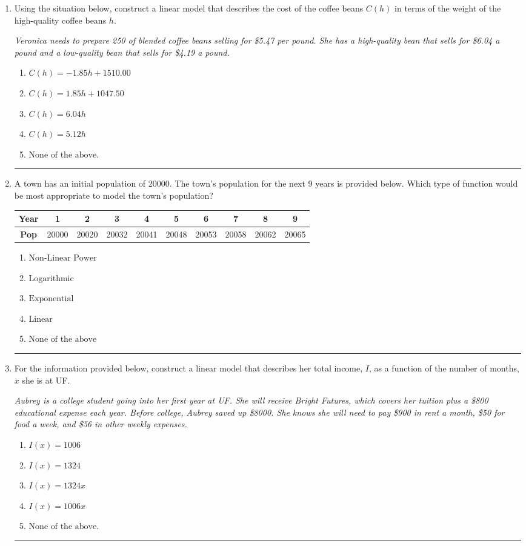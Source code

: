 \documentclass[14pt]{extbook}
\newcommand{\litem}[1]{\item#1\hspace*{-1cm}\rule{\textwidth}{0.4pt}}
\begin{document}
\begin{enumerate}
{\begin{enumerate}[label=\Alph*.]
\end{enumerate} }
\litem{
Using the situation below, construct a linear model that describes the cost of the coffee beans $C(h)$ in terms of the weight of the high-quality coffee beans $h$.
\begin{center}
    \textit{ Veronica needs to prepare 250 of blended coffee beans selling for \$5.47 per pound. She has a high-quality bean that sells for \$6.04 a pound and a low-quality bean that sells for \$4.19 a pound. }
\end{center}
\begin{enumerate}[label=\Alph*.]
\item \( C(h) = -1.85 h + 1510.00 \)
\item \( C(h) = 1.85 h + 1047.50 \)
\item \( C(h) = 6.04 h \)
\item \( C(h) = 5.12 h \)
\item \( \text{None of the above.} \)

\end{enumerate} }
\litem{
A town has an initial population of 20000. The town's population for the next 9 years is provided below. Which type of function would be most appropriate to model the town's population?

\begin{tabular}{c|c|c|c|c|c|c|c|c|c}
\textbf{Year} &1 &2 &3 &4 &5 &6 &7 &8 &9\tabularnewline \hline
\textbf{Pop} &20000 &20020 &20032 &20041 &20048 &20053 &20058 &20062 &20065\end{tabular}\begin{enumerate}[label=\Alph*.]
\item \( \text{Non-Linear Power} \)
\item \( \text{Logarithmic} \)
\item \( \text{Exponential} \)
\item \( \text{Linear} \)
\item \( \text{None of the above} \)

\end{enumerate} }
\litem{
For the information provided below, construct a linear model that describes her total income, $I$, as a function of the number of months, $x$ she is at UF.
\begin{center}
    \textit{ Aubrey is a college student going into her first year at UF. She will receive Bright Futures, which covers her tuition plus a \$800 educational expense each year. Before college, Aubrey saved up \$8000. She knows she will need to pay \$900 in rent a month, \$50 for food a week, and \$56 in other weekly expenses. }
\end{center}
\begin{enumerate}[label=\Alph*.]
\item \( I(x) = 1006 \)
\item \( I(x) = 1324 \)
\item \( I(x) = 1324 x \)
\item \( I(x) = 1006 x \)
\item \( \text{None of the above.} \)


\end{enumerate}}
\end{enumerate}
\end{document}
